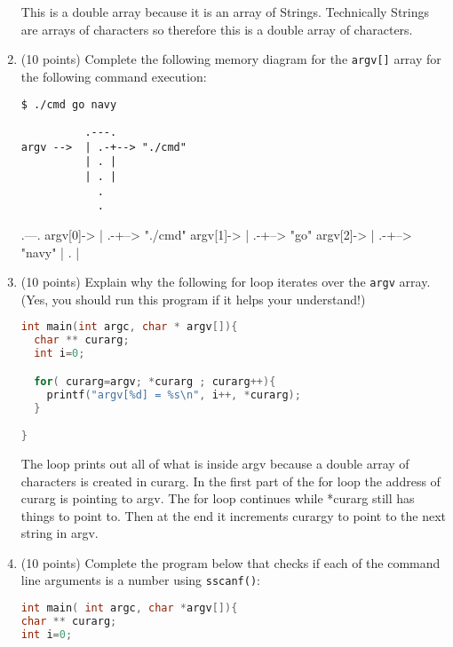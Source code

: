 \documentclass{article}[9pt]
\newenvironment{answerfont}{\fontfamily{qhv}\selectfont}{\par}
\newenvironment{myanswer}{\begin{mdframed}\begin{answerfont}}{\end{answerfont}\end{mdframed}}
\begin{document}
\begin{enumerate}
\begin{myanswer}
This is a double array because it is an array of Strings. Technically Strings are arrays of characters so therefore this is a
double array of characters.
\end{myanswer}

\item (10 points) Complete the following memory diagram for the \texttt{argv[]} array for
the following command execution:

\begin{verbatim}
$ ./cmd go navy
\end{verbatim}

\begin{verbatim}
          .---.
argv -->  | .-+--> "./cmd"
          | . |
          | . |
            .
            .
\end{verbatim}

\begin{myanswer}{verbatim}
          .---.
argv[0]-> | .-+--> "./cmd"
argv[1]-> | .-+--> "go"
argv[2]-> | .-+--> "navy"
          | . |
\end{myanswer}


\item (10 points) Explain why the following for loop iterates over the \texttt{argv}
array. (Yes, you should run this program if it helps your
understand!)

\begin{lstlisting}[language=c]
int main(int argc, char * argv[]){
  char ** curarg;
  int i=0;

  for( curarg=argv; *curarg ; curarg++){
    printf("argv[%d] = %s\n", i++, *curarg);
  }

}
\end{lstlisting}

\begin{myanswer}
The loop prints out all of what is inside argv because a double array of characters is created in curarg. In the first part of
the for loop the address of curarg is pointing to argv. The for loop continues while *curarg still has things to point to. Then at the
end it increments curargy to point to the next string in argv.
\end{myanswer}

\item (10 points) Complete the program below that checks if each of the
command line arguments is a number using \texttt{sscanf()}:

\begin{lstlisting}[language=c]
int main( int argc, char *argv[]){
char ** curarg;
int i=0;



\end{lstlisting}
\end{enumerate}
\end{document}
